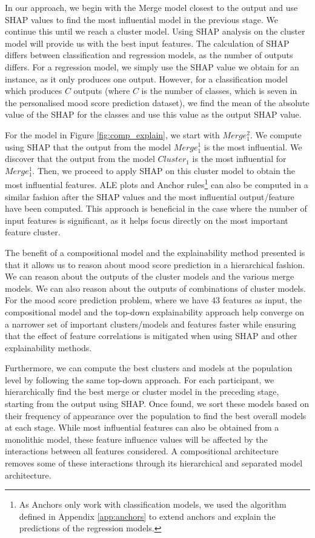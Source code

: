 In our approach, we begin with the Merge model closest to the output and use SHAP values to find the most influential model in the previous stage. We continue this until we reach a cluster model. Using SHAP analysis on the cluster model will provide us with the best input features. The calculation of SHAP differs between classification and regression models, as the number of outputs differs. For a regression model, we simply use the SHAP value we obtain for an instance, as it only produces one output. However, for a classification model which produces $C$ outputs (where $C$ is the number of classes, which is seven in the personalised mood score prediction dataset), we find the mean of the absolute value of the SHAP for the classes and use this value as the output SHAP value. 

For the model in Figure \ref{fig:comp_explain}, we start with $Merge_1^2$. We compute using SHAP that the output from the model $Merge_1^1$ is the most influential. We discover that the output from the model $Cluster_1$ is the most influential for  $Merge_1^1$. Then, we proceed to apply SHAP on this cluster model to obtain the most influential features. ALE plots and Anchor rules\footnote{As Anchors only work with classification models, we used the algorithm defined in Appendix \ref{app:anchors} to extend anchors and explain the predictions of the regression models.}  can also be computed in a similar fashion after the SHAP values and the most influential output/feature have been computed. This approach is beneficial in the case where the number of input features is significant, as it helps focus directly on the most important feature cluster.

The benefit of a compositional model and the explainability method presented is that it allows us to reason about mood score prediction in a hierarchical fashion. We can reason about the outputs of the cluster models and the various merge models. We can also reason about the outputs of combinations of cluster models. For the mood score prediction problem, where we have 43 features as input, the compositional model and the top-down explainability approach help converge on a narrower set of important clusters/models and features faster while ensuring that the effect of feature correlations is mitigated when using SHAP and other explainability methods. 

Furthermore, we can compute the best clusters and models at the population level by following the same top-down approach. For each participant, we hierarchically find the best merge or cluster model in the preceding stage, starting from the output using SHAP. Once found, we sort these models based on their frequency of appearance over the population to find the best overall models at each stage. While most influential features can also be obtained from a monolithic model, these feature influence values will be affected by the interactions between all features considered. A compositional architecture removes some of these interactions through its hierarchical and separated model architecture.

